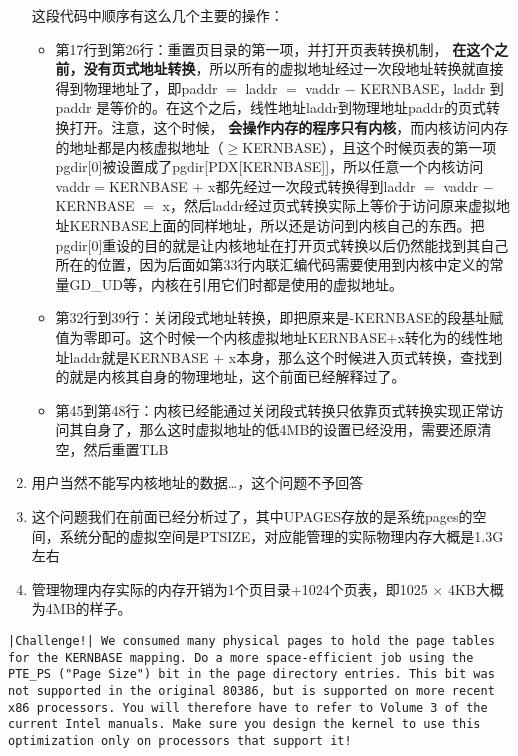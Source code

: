 \documentclass{article}
\newcommand{\highlight}[1]{{\bfseries \color{red}  #1}}
\begin{document}
\begin{CJK*}{UTF8}{gkai}
\begin{enumerate}
{这段代码中顺序有这么几个主要的操作：
\begin{itemize}
\item{第17行到第26行：重置页目录的第一项，并打开页表转换机制，\highlight{在这个之前，没有页式地址转换}，所以所有的虚拟地址经过一次段地址转换就直接得到物理地址了，即paddr $=$ laddr $=$ vaddr $-$ KERNBASE，laddr 到 paddr 是等价的。在这个之后，线性地址laddr到物理地址paddr的页式转换打开。注意，这个时候，\highlight{会操作内存的程序只有内核}，而内核访问内存的地址都是内核虚拟地址（$\geq$KERNBASE），且这个时候页表的第一项pgdir[0]被设置成了pgdir[PDX[KERNBASE]]，所以任意一个内核访问vaddr$=$KERNBASE $+$ x都先经过一次段式转换得到laddr $=$ vaddr $-$ KERNBASE $=$ x，然后laddr经过页式转换实际上等价于访问原来虚拟地址KERNBASE上面的同样地址，所以还是访问到内核自己的东西。把pgdir[0]重设的目的就是让内核地址在打开页式转换以后仍然能找到其自己所在的位置，因为后面如第33行内联汇编代码需要使用到内核中定义的常量GD\_UD等，内核在引用它们时都是使用的虚拟地址。}
\item{第32行到39行：关闭段式地址转换，即把原来是-KERNBASE的段基址赋值为零即可。这个时候一个内核虚拟地址KERNBASE$+$x转化为的线性地址laddr就是KERNBASE $+$ x本身，那么这个时候进入页式转换，查找到的就是内核其自身的物理地址，这个前面已经解释过了。}
\item{第45到第48行：内核已经能通过关闭段式转换只依靠页式转换实现正常访问其自身了，那么这时虚拟地址的低4MB的设置已经没用，需要还原清空，然后重置TLB}
\end{itemize}
}

\item{用户当然不能写内核地址的数据\ldots，这个问题不予回答}
\item{这个问题我们在前面已经分析过了，其中UPAGES存放的是系统pages的空间，系统分配的虚拟空间是PTSIZE，对应能管理的实际物理内存大概是1.3G左右}
\item{管理物理内存实际的内存开销为1个页目录+1024个页表，即1025 $\times$ 4KB大概为4MB的样子。}
\end{enumerate}

\vspace{4em}

\begin{lstlisting}[style=challenge]
|Challenge!| We consumed many physical pages to hold the page tables for the KERNBASE mapping. Do a more space-efficient job using the PTE_PS ("Page Size") bit in the page directory entries. This bit was not supported in the original 80386, but is supported on more recent x86 processors. You will therefore have to refer to Volume 3 of the current Intel manuals. Make sure you design the kernel to use this optimization only on processors that support it!
\end{lstlisting}


\end{CJK*}
\end{document}
